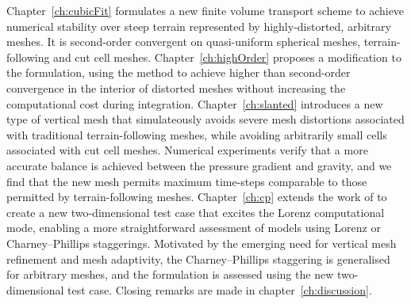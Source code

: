 Chapter~\ref{ch:cubicFit} formulates a new finite volume transport scheme to achieve numerical stability over steep terrain represented by highly-distorted, arbitrary meshes.
It is second-order convergent on quasi-uniform spherical meshes, terrain-following and cut cell meshes.
Chapter~\ref{ch:highOrder} proposes a modification to the formulation, using the \kexact{} method \citep{barth1995} to achieve higher than second-order convergence in the interior of distorted meshes without increasing the computational cost during integration.
Chapter~\ref{ch:slanted} introduces a new type of vertical mesh that simulateously avoids severe mesh distortions associated with traditional terrain-following meshes, while avoiding arbitrarily small cells associated with cut cell meshes.
Numerical experiments verify that a more accurate balance is achieved between the pressure gradient and gravity, and we find that the new mesh permits maximum time-steps comparable to those permitted by terrain-following meshes.
Chapter~\ref{ch:cp} extends the work of \citet{arakawa-konor1996} to create a new two-dimensional test case that excites the Lorenz computational mode, enabling a more straightforward assessment of models using Lorenz or Charney--Phillips staggerings.
Motivated by the emerging need for vertical mesh refinement and mesh adaptivity, the Charney--Phillips staggering is generalised for arbitrary meshes, and the formulation is assessed using the new two-dimensional test case.
Closing remarks are made in chapter~\ref{ch:discussion}.

